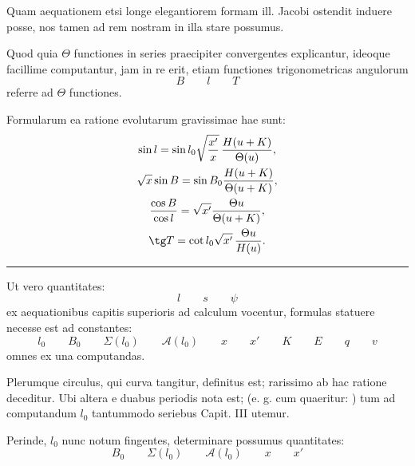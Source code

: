 \begingroup\small
Quam aequationem etsi longe elegantiorem formam ill. Jacobi ostendit induere posse, nos tamen ad rem nostram in illa stare possumus.


Quod quia $\Theta$ functiones in series praecipiter convergentes explicantur, ideoque facillime computantur, jam in re erit, etiam functiones trigonometricas angulorum
\[
 B\qquad l\qquad T
\]
referre ad $\Theta$ functiones.

Formularum ea ratione evolutarum gravissimae hae sunt:
\[
\begin{gathered}
 \sin l=\sin l_0\sqrt{x'\over x}\,{H(u+K)\over\Theta(u)},\\
 \sqrt{x}\sin B=\sin B_0{H(u+K)\over\Theta(u+K)},\\
 {\cos B\over\cos l}=\sqrt{x'}{\Theta u\over\Theta(u+K)},\\
 \tg T=\cot l_0\sqrt{x'}\,{\Theta u\over H(u)}.
\end{gathered}
\]

\rule{0.35\textwidth}{0.4pt}


Ut vero quantitates:
\[
 l\qquad s\qquad \psi
\]
ex aequationibus capitis superioris ad calculum vocentur, formulas statuere necesse est ad constantes:
\[
 l_0\qquad B_0\qquad \Sigma(l_0)\qquad \mathcal A(l_0)\qquad x\qquad x'\qquad K\qquad E\qquad q\qquad v
\]
omnes ex una computandas.


Plerumque circulus, qui curva tangitur, definitus est; rarissimo ab hac ratione deceditur. Ubi altera e duabus periodis nota est; (e. g. cum quaeritur: ) tum ad computandum $l_0$ tantummodo seriebus Capit. III utemur.


Perinde, $l_0$ nunc notum fingentes, determinare possumus quantitates:
\[
 B_0\qquad \Sigma(l_0)\qquad \mathcal A(l_0)\qquad x\qquad x'
\]
\endgroup
